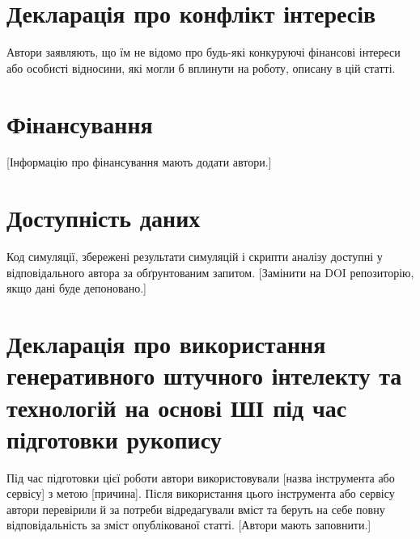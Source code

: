 \section*{Декларація про конфлікт інтересів}
Автори заявляють, що їм не відомо про будь-які конкуруючі фінансові інтереси або особисті відносини, які могли б вплинути на роботу, описану в цій статті.

\section*{Фінансування}
[Інформацію про фінансування мають додати автори.]

\section*{Доступність даних}
Код симуляції, збережені результати симуляцій і скрипти аналізу доступні у відповідального автора за обґрунтованим запитом. [Замінити на DOI репозиторію, якщо дані буде депоновано.]

\section*{Декларація про використання генеративного штучного інтелекту та технологій на основі ШІ під час підготовки рукопису}
Під час підготовки цієї роботи автори використовували [назва інструмента або сервісу] з метою [причина]. Після використання цього інструмента або сервісу автори перевірили й за потреби відредагували вміст та беруть на себе повну відповідальність за зміст опублікованої статті. [Автори мають заповнити.]

